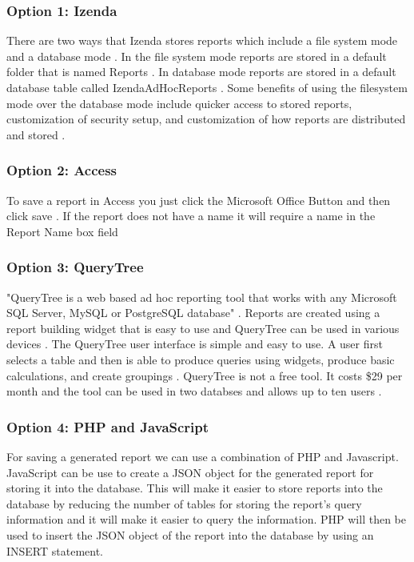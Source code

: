 \documentclass[letterpaper,10pt,serif, draftclsnofoot,onecolumn, compsoc, titlepage]{IEEEtran}
\begin{document}

\subsubsection{Option 1: Izenda}
There are two ways that Izenda stores reports which include a file system mode and a database mode \cite{Adams}. In the file system mode reports are stored in a default folder that is named Reports \cite{Adams}. In database mode reports are stored in a default database table called IzendaAdHocReports \cite{Adams}. Some benefits of using the filesystem mode over the database mode include quicker access to stored reports, customization of security setup, and customization of how reports are distributed and stored \cite{Adams}. 

\subsubsection{Option 2: Access}
To save a report in Access you just click the Microsoft Office Button and then click save \cite{SimpleReport}. If the report does not have a name it will require a name in the Report Name box field \cite{SimpleReport}

\subsubsection{Option 3: QueryTree}
"QueryTree is a web based ad hoc reporting tool that works with any Microsoft SQL Server, MySQL or PostgreSQL database" \cite{QueryTree}. Reports are created using a report building widget that is easy to use and QueryTree can be used in various devices \cite{QueryTree}. The QueryTree user interface is simple and easy to use. A user first selects a table and then is able to produce queries using widgets, produce basic calculations, and create groupings \cite{QueryTree}. QueryTree is not a free tool. It costs \$29 per month and the tool can be used in two databses and allows up to ten users \cite{QueryTree}. 

\subsubsection{Option 4: PHP and JavaScript}
For saving a generated report we can use a combination of PHP and Javascript. JavaScript can be use to create a JSON object for the generated report for storing it into the database. This will make it easier to store reports into the database by reducing the number of tables for storing the report's query information and it will make it easier to query the information. PHP will then be used to insert the JSON object of the report into the database by using an INSERT statement.  
\end{document}
